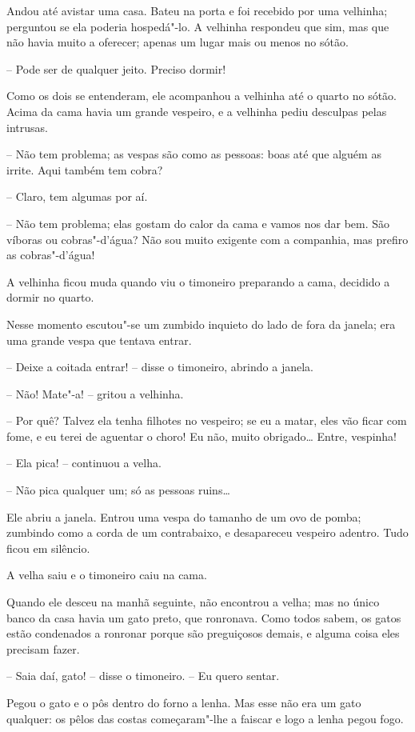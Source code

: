 Andou até avistar uma casa. Bateu na porta e foi recebido por uma
velhinha; perguntou se ela poderia hospedá"-lo. A velhinha respondeu
que sim, mas que não havia muito a oferecer; apenas um lugar mais ou
menos no sótão.

-- Pode ser de qualquer jeito. Preciso dormir!

Como os dois se entenderam, ele acompanhou a velhinha até o quarto no
sótão. Acima da cama havia um grande vespeiro, e a velhinha pediu
desculpas pelas intrusas.

-- Não tem problema; as vespas são como as pessoas: boas até que alguém
as irrite. Aqui também tem cobra?

-- Claro, tem algumas por aí.

-- Não tem problema; elas gostam do calor da cama e vamos nos dar bem.
São víboras ou cobras"-d’água? Não sou muito exigente com a companhia,
mas prefiro as cobras"-d’água!

A velhinha ficou muda quando viu o timoneiro preparando a cama, decidido
a dormir no quarto. 

Nesse momento escutou"-se um zumbido inquieto do lado de fora da
janela; era uma grande vespa que tentava entrar.

-- Deixe a coitada entrar! -- disse o timoneiro, abrindo a janela.

-- Não! Mate"-a! -- gritou a velhinha.

-- Por quê? Talvez ela tenha filhotes no vespeiro; se eu a matar, eles
vão ficar com fome, e eu terei de aguentar o choro! Eu não, muito
obrigado\ldots{} Entre, vespinha!

-- Ela pica! -- continuou a velha.

-- Não pica qualquer um; só as pessoas ruins\ldots{}

Ele abriu a janela. Entrou uma vespa do tamanho de um ovo de pomba;
zumbindo como a corda de um contrabaixo, e desapareceu vespeiro
adentro. Tudo ficou em silêncio. 

A velha saiu e o timoneiro caiu na cama. 

Quando ele desceu na manhã seguinte, não encontrou a velha; mas no único
banco da casa havia um gato preto, que ronronava. Como todos sabem, os
gatos estão condenados a ronronar porque são preguiçosos demais, e
alguma coisa eles precisam fazer.

-- Saia daí, gato! -- disse o timoneiro. -- Eu quero sentar.

Pegou o gato e o pôs dentro do forno a lenha. Mas esse não era um gato
qualquer: os pêlos das costas começaram"-lhe a faiscar e logo a lenha
pegou fogo.

